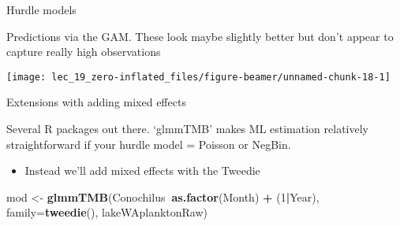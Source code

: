 \documentclass[ignorenonframetext,]{beamer}
\newenvironment{Shaded}{\begin{snugshade}}{\end{snugshade}}
\newcommand{\DataTypeTok}[1]{\textcolor[rgb]{0.13,0.29,0.53}{#1}}
\newcommand{\DecValTok}[1]{\textcolor[rgb]{0.00,0.00,0.81}{#1}}
\newcommand{\KeywordTok}[1]{\textcolor[rgb]{0.13,0.29,0.53}{\textbf{#1}}}
\newcommand{\NormalTok}[1]{#1}
\newcommand{\OperatorTok}[1]{\textcolor[rgb]{0.81,0.36,0.00}{\textbf{#1}}}
\newcommand{\StringTok}[1]{\textcolor[rgb]{0.31,0.60,0.02}{#1}}
\providecommand{\tightlist}{%
  \setlength{\itemsep}{0pt}\setlength{\parskip}{0pt}}
\begin{document}
\begin{frame}[fragile]{Hurdle models}
\protect\hypertarget{hurdle-models-3}{}

Predictions via the GAM. These look maybe slightly better but don't
appear to capture really high observations

\begin{Shaded}
\end{Shaded}

\begin{center}\texttt{[image: lec\_19\_zero-inflated\_files/figure-beamer/unnamed-chunk-18-1]} \end{center}

\end{frame}

\begin{frame}[fragile]{Extensions with adding mixed effects}
\protect\hypertarget{extensions-with-adding-mixed-effects}{}

Several R packages out there. `glmmTMB' makes ML estimation relatively
straightforward if your hurdle model = Poisson or NegBin.

\begin{itemize}
\tightlist
\item
  Instead we'll add mixed effects with the Tweedie
\end{itemize}

\begin{Shaded}
\begin{Highlighting}[]
\NormalTok{mod <-}\StringTok{ }\KeywordTok{glmmTMB}\NormalTok{(Conochilus}\OperatorTok{~}\KeywordTok{as.factor}\NormalTok{(Month) }\OperatorTok{+}\StringTok{ }\NormalTok{(}\DecValTok{1}\OperatorTok{|}\NormalTok{Year), }
  \DataTypeTok{family=}\KeywordTok{tweedie}\NormalTok{(), lakeWAplanktonRaw)}
\end{Highlighting}
\end{Shaded}

\end{frame}
\end{document}
